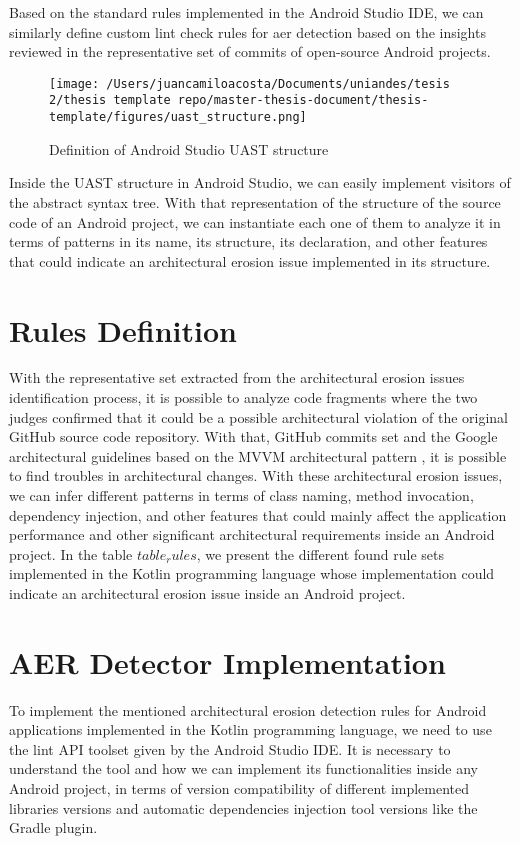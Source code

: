 Based on the standard rules implemented in the Android Studio IDE, we can similarly define custom lint check rules for aer detection based on the insights reviewed in the representative set of commits of open-source Android projects. 

\begin{figure}[h]
    	\centering
    		\texttt{[image: /Users/juancamiloacosta/Documents/uniandes/tesis 2/thesis template repo/master-thesis-document/thesis-template/figures/uast\_structure.png]}
   			 \caption{Definition of Android Studio UAST structure \citet{} }
   			 \label{fig:ast}
\end{figure}

Inside the UAST structure in Android Studio, we can easily implement visitors of the abstract syntax tree. With that representation of the structure of the source code of an Android project, we can instantiate each one of them to analyze it in terms of patterns in its name, its structure, its declaration, and other features that could indicate an architectural erosion issue implemented in its structure.

\section{Rules Definition}
With the representative set extracted from the architectural erosion issues identification process, it is possible to analyze code fragments where the two judges confirmed that it could be a possible architectural violation of the original GitHub source code repository. With that, GitHub commits set and the Google architectural guidelines based on the MVVM architectural pattern \citet{}, it is possible to find troubles in architectural changes. With these architectural erosion issues, we can infer different patterns in terms of class naming, method invocation, dependency injection, and other features that could mainly affect the application performance and other significant architectural requirements inside an Android project. In the table $table_rules$, we present the different found rule sets implemented in the Kotlin programming language whose implementation could indicate an architectural erosion issue inside an Android project.

\section{AER Detector Implementation}
To implement the mentioned architectural erosion detection rules for Android applications implemented in the Kotlin programming language, we need to use the lint API toolset given by the Android Studio IDE. It is necessary to understand the tool and how we can implement its functionalities inside any Android project, in terms of version compatibility of different implemented libraries versions and automatic dependencies injection tool versions like the Gradle plugin. 


